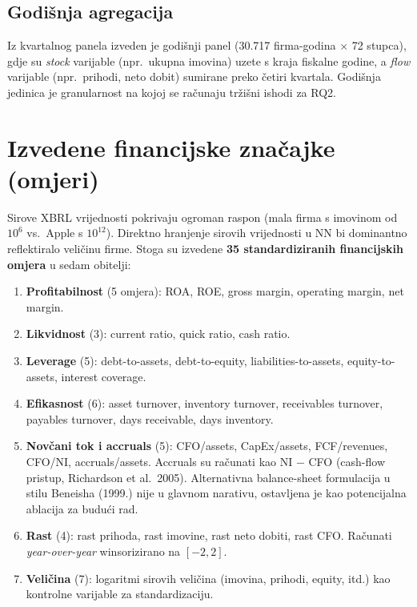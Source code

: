 \documentclass[diplomskirad,authoryear]{fer}
\begin{document}
\subsection{Godišnja agregacija}
Iz kvartalnog panela izveden je godišnji panel (30.717 firma-godina $\times$ 72 stupca), gdje su \emph{stock} varijable (npr.\ ukupna imovina) uzete s kraja fiskalne godine, a \emph{flow} varijable (npr.\ prihodi, neto dobit) sumirane preko četiri kvartala. Godišnja jedinica je granularnost na kojoj se računaju tržišni ishodi za RQ2.

\section{Izvedene financijske značajke (omjeri)}

Sirove XBRL vrijednosti pokrivaju ogroman raspon (mala firma s imovinom od $10^6$ vs.\ Apple s $10^{12}$). Direktno hranjenje sirovih vrijednosti u NN bi dominantno reflektiralo veličinu firme. Stoga su izvedene \textbf{35 standardiziranih financijskih omjera} u sedam obitelji:

\begin{enumerate}
 \item \textbf{Profitabilnost} (5 omjera): ROA, ROE, gross margin, operating margin, net margin.
 \item \textbf{Likvidnost} (3): current ratio, quick ratio, cash ratio.
 \item \textbf{Leverage} (5): debt-to-assets, debt-to-equity, liabilities-to-assets, equity-to-assets, interest coverage.
 \item \textbf{Efikasnost} (6): asset turnover, inventory turnover, receivables turnover, payables turnover, days receivable, days inventory.
 \item \textbf{Novčani tok i accruals} (5): CFO/assets, CapEx/assets, FCF/revenues, CFO/NI, accruals/assets. Accruals su računati kao NI $-$ CFO (cash-flow pristup, Richardson et al.\ 2005). Alternativna balance-sheet formulacija u stilu Beneisha (1999.) nije u glavnom narativu, ostavljena je kao potencijalna ablacija za budući rad.
 \item \textbf{Rast} (4): rast prihoda, rast imovine, rast neto dobiti, rast CFO. Računati \emph{year-over-year} winsorizirano na $[-2, 2]$.
 \item \textbf{Veličina} (7): logaritmi sirovih veličina (imovina, prihodi, equity, itd.) kao kontrolne varijable za standardizaciju.
\end{enumerate}
\end{document}
